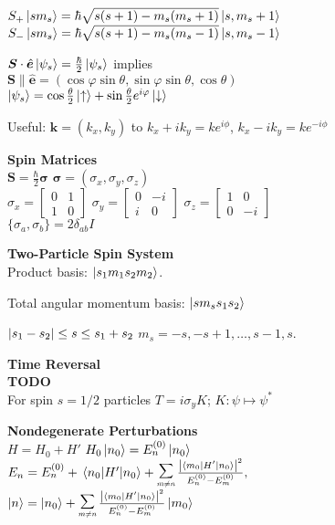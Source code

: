 \documentclass[11pt, a4paper]{article}
\newcommand{\newsec}[1]{\vspace{2mm}\textbf{#1}\\}
\renewcommand{\vec}[1]{\bm{#1}} %
\newcommand{\uvec}[1]{\hat{\vec{#1}}} %
\newcommand{\ua}{\uparrow}  %
\newcommand{\da}{\downarrow}  %
\renewcommand{\k}[1]{\ket{#1}}
\newcommand{\tsum}[1]{\raisebox{0.5ex}{\scalebox{0.8}{$\displaystyle \sum_{#1}\,$}}} %
\begin{document}
\begin{multicols}{2}
$ S_{+} \ket{sm_{s}} = \hbar \sqrt{s(s+1) - m_{s}(m_{s}+1)}\ket{s, m_{s}+1} $\\
$ S_{-} \ket{sm_{s}} = \hbar \sqrt{s(s+1) - m_{s}(m_{s}-1)}\ket{s, m_{s}-1} $



$ \vec{S} \cdot \uvec{e} \ket{\psi_{s}} = \frac{\hbar}{2}\ket{\psi_{s}} $ implies\\
\null \quad $  \vec{S} \parallel \uvec{e} = (\cos \varphi \sin \theta, \sin \varphi \sin \theta, \cos \theta) $  \\
\null \quad $ \ket{\psi_{s}} = \cos \frac{\theta}{2} \ket{\ua} + \sin \frac{\theta}{2} e^{i\varphi} \ket{\da} $

Useful:  $ \vec{k} = (k_{x}, k_{y}) $ to $ 	k_{x} + ik_{y} = ke^{i\phi}  $, $ k_{x} - ik_{y} = ke^{-i\phi} $

\newsec{Spin Matrices}
$ \vec{S} = \frac{\hbar}{2}\vec{\sigma} $ \qquad  $  \vec{\sigma} = (\sigma_{x}, \sigma_{y}, \sigma_{z}) $\\
$ \sigma_{x} = 
\begin{bmatrix}
	0 & 1\\
	1 & 0
\end{bmatrix} $
\quad 
$ \sigma_{y} = 
\begin{bmatrix}
	0 & -i\\
	i & 0
\end{bmatrix} $
\quad 
$ \sigma_{z} = 
\begin{bmatrix}
	1 & 0\\
	0 & -i
\end{bmatrix} $\\
$ \{\sigma_{a}, \sigma_{b}\} = 2\delta_{ab}I $ 


\newsec{Two-Particle Spin System}
Product basis: $ \ket{s_{1}m_{1}s_{2}m_{2}} $.

Total angular momentum basis: $ \k{sm_{s}s_{1}s_{2}} $

$ \abs{s_{1} - s_{2}} \leq s \leq s_{1} + s_{2}  $ \qquad $ m_{s} = -s, -s+1, \ldots, s-1, s $.



\newsec{Time Reversal}
\textbf{TODO}\\
For spin $ s = 1/2  $ particles $ T = i\sigma_{y}K $; $ K: \psi \mapsto \psi^{*} $



\newsec{Nondegenerate Perturbations}
$ H = H_{0} + H' $ \qquad $ H_{0} \ket{n_{0}} = E^{(0)}_{n} \ket{n_{0}} $ \\
$ E_{n} = E^{(0)}_{n} + \mel{n_{0}}{H'}{n_{0}} + \tsum{m\neq n}\frac{\abs{\mel{m_{0}}{H'}{n_{0}}}^{2}}{E^{(0)}_{n}-E^{(0)}_{m}}, $\\
$ \ket{n} = \ket{n_{0}} + \tsum{m\neq n}\frac{\abs{\bra{m_{0}}H'\ket{n_{0}}}^{2}}{E^{(0)}_{n}-E^{(0)}_{m}} \ket{m_{0}} $



\end{multicols}
\end{document}
